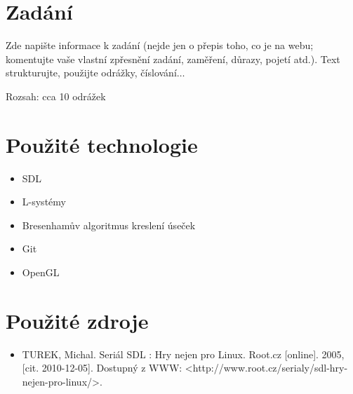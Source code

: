 \documentclass[11pt,a4paper]{article}
\begin{document}
\titlepageandcontents

\section{Zadání}

Zde napište informace k zadání (nejde jen o přepis toho, co je na webu;
komentujte vaše vlastní zpřesnění zadání, zaměření, důrazy, pojetí atd.). Text
strukturujte, použijte odrážky, číslování$\ldots$

Rozsah: cca 10 odrážek

\section{Použité technologie}

%

\begin{itemize}
\item SDL
\item L-systémy
\item Bresenhamův algoritmus kreslení úseček
\item Git
\item OpenGL
\end{itemize}

\section{Použité zdroje}

%

\begin{itemize}
\item TUREK, Michal. Seriál SDL : Hry nejen pro Linux. Root.cz [online]. 2005, [cit. 2010-12-05]. Dostupný z WWW: <http://www.root.cz/serialy/sdl-hry-nejen-pro-linux/>.
\end{itemize}
\end{document}
